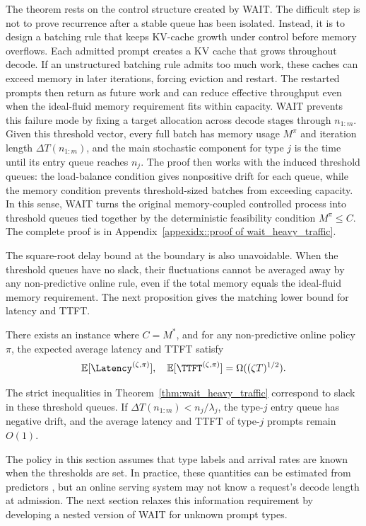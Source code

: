 The theorem rests on the control structure created by WAIT. The difficult step is not to prove recurrence after a stable queue has been isolated. Instead, it is to design a batching rule that keeps KV-cache growth under control before memory overflows. Each admitted prompt creates a KV cache that grows throughout decode. If an unstructured batching rule admits too much work, these caches can exceed memory in later iterations, forcing eviction and restart. The restarted prompts then return as future work and can reduce effective throughput even when the ideal-fluid memory requirement fits within capacity. WAIT prevents this failure mode by fixing a target allocation across decode stages through \(n_{1:m}\). Given this threshold vector, every full batch has memory usage \(M^\pi\) and iteration length \(\Delta T(n_{1:m})\), and the main stochastic component for type \(j\) is the time until its entry queue reaches \(n_j\). The proof then works with the induced threshold queues: the load-balance condition gives nonpositive drift for each queue, while the memory condition prevents threshold-sized batches from exceeding capacity. In this sense, WAIT turns the original memory-coupled controlled process into threshold queues tied together by the deterministic feasibility condition \(M^\pi\le C\). The complete proof is in Appendix~\ref{appexidx::proof of wait_heavy_traffic}.

The square-root delay bound at the boundary is also unavoidable. When the threshold queues have no slack, their fluctuations cannot be averaged away by any non-predictive online rule, even if the total memory equals the ideal-fluid memory requirement. The next proposition gives the matching lower bound for latency and TTFT.
\begin{proposition}\label{prop::simple random walk, tight bound}
There exists an instance where \( C = M^* \), and for any non-predictive online policy \(\pi\), the expected average latency and TTFT satisfy
\[
\mathbb{E}[\Latency^{(\zeta,\pi)}],\quad \mathbb{E}[\TTFT^{(\zeta,\pi)}] = \Omega((\zeta T)^{1/2}).
\]
\end{proposition}
The strict inequalities in Theorem~\ref{thm:wait_heavy_traffic} correspond to slack in these threshold queues. If \(\Delta T(n_{1:m})<n_j/\lambda_j\), the type-\(j\) entry queue has negative drift, and the average latency and TTFT of type-\(j\) prompts remain \(O(1)\).

The policy in this section assumes that type labels and arrival rates are known when the thresholds are set. In practice, these quantities can be estimated from predictors \citep{fu2025efficient}, but an online serving system may not know a request's decode length at admission. The next section relaxes this information requirement by developing a nested version of WAIT for unknown prompt types.
